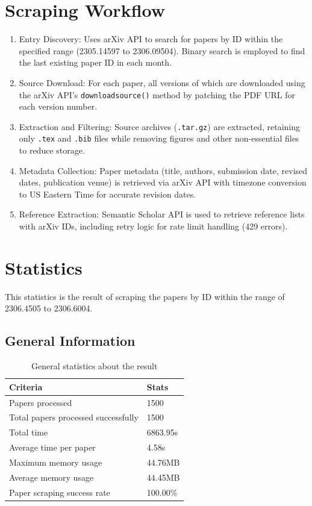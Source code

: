 \documentclass[11pt]{report}
\newcounter{subsectioncount}
\newcounter{subsubsectioncount}
\let\oldsubsection\subsection
\renewcommand{\subsection}[1]{%
  \stepcounter{subsectioncount}%
  \setcounter{subsubsectioncount}{0}%
  \oldsubsection{#1}%
}
\begin{document}
\section{Scraping Workflow}
\begin{enumerate}
    \item Entry Discovery: Uses arXiv API to search for papers by ID within the specified range (2305.14597 to 2306.09504). Binary search is employed to find the last existing paper ID in each month.
    \item Source Download: For each paper, all versions of which are downloaded using the arXiv API's \texttt{download\textunderscore source()} method by patching the PDF URL for each version number.
    \item Extraction and Filtering: Source archives (\texttt{.tar.gz}) are extracted, retaining only \texttt{.tex} and \texttt{.bib} files while removing figures and other non-essential files to reduce storage.
    \item Metadata Collection: Paper metadata (title, authors, submission date, revised dates, publication venue) is retrieved via arXiv API with timezone conversion to US Eastern Time for accurate revision dates.
    \item Reference Extraction: Semantic Scholar API is used to retrieve reference lists with arXiv IDs, including retry logic for rate limit handling (429 errors).
\end{enumerate}

\section{Statistics}
This statistics is the result of scraping the papers by ID within the range of 2306.4505 to 2306.6004.
\subsection{General Information}
\begin{table}[H]
\centering
   \begin{tabular}{|l|l|}
        \hline
        \textbf{Criteria} & \textbf{Stats} \\
        \hline
        Papers processed & 1500 \\
        \hline
        Total papers processed successfully & 1500 \\
        \hline
        Total time & 6863.95s \\
        \hline
        Average time per paper & 4.58s \\
        \hline
        Maximum memory usage & 44.76MB \\
        \hline
        Average memory usage & 44.45MB \\
        \hline
        Paper scraping success rate & 100.00\% \\
        \hline
    \end{tabular}   
    \caption{General statistics about the result}
\end{table}
\end{document}
